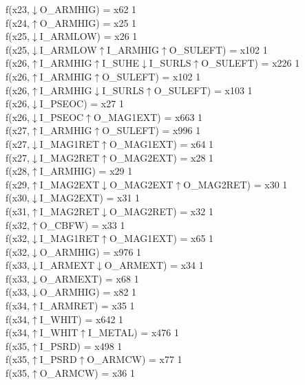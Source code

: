 f(x23,$\downarrow$O\_ARMHIG) = x62 {1} \\
f(x24,$\uparrow$O\_ARMHIG) = x25 {1} \\
f(x25,$\downarrow$I\_ARMLOW) = x26 {1} \\
f(x25,$\downarrow$I\_ARMLOW$\uparrow$I\_ARMHIG$\uparrow$O\_SULEFT) = x102 {1} \\
f(x26,$\uparrow$I\_ARMHIG$\uparrow$I\_SUHE$\downarrow$I\_SURLS$\uparrow$O\_SULEFT) = x226 {1} \\
f(x26,$\uparrow$I\_ARMHIG$\uparrow$O\_SULEFT) = x102 {1} \\
f(x26,$\uparrow$I\_ARMHIG$\downarrow$I\_SURLS$\uparrow$O\_SULEFT) = x103 {1} \\
f(x26,$\downarrow$I\_PSEOC) = x27 {1} \\
f(x26,$\downarrow$I\_PSEOC$\uparrow$O\_MAG1EXT) = x663 {1} \\
f(x27,$\uparrow$I\_ARMHIG$\uparrow$O\_SULEFT) = x996 {1} \\
f(x27,$\downarrow$I\_MAG1RET$\uparrow$O\_MAG1EXT) = x64 {1} \\
f(x27,$\downarrow$I\_MAG2RET$\uparrow$O\_MAG2EXT) = x28 {1} \\
f(x28,$\uparrow$I\_ARMHIG) = x29 {1} \\
f(x29,$\uparrow$I\_MAG2EXT$\downarrow$O\_MAG2EXT$\uparrow$O\_MAG2RET) = x30 {1} \\
f(x30,$\downarrow$I\_MAG2EXT) = x31 {1} \\
f(x31,$\uparrow$I\_MAG2RET$\downarrow$O\_MAG2RET) = x32 {1} \\
f(x32,$\uparrow$O\_CBFW) = x33 {1} \\
f(x32,$\downarrow$I\_MAG1RET$\uparrow$O\_MAG1EXT) = x65 {1} \\
f(x32,$\downarrow$O\_ARMHIG) = x976 {1} \\
f(x33,$\downarrow$I\_ARMEXT$\downarrow$O\_ARMEXT) = x34 {1} \\
f(x33,$\downarrow$O\_ARMEXT) = x68 {1} \\
f(x33,$\downarrow$O\_ARMHIG) = x82 {1} \\
f(x34,$\uparrow$I\_ARMRET) = x35 {1} \\
f(x34,$\uparrow$I\_WHIT) = x642 {1} \\
f(x34,$\uparrow$I\_WHIT$\uparrow$I\_METAL) = x476 {1} \\
f(x35,$\uparrow$I\_PSRD) = x498 {1} \\
f(x35,$\uparrow$I\_PSRD$\uparrow$O\_ARMCW) = x77 {1} \\
f(x35,$\uparrow$O\_ARMCW) = x36 {1} \\

